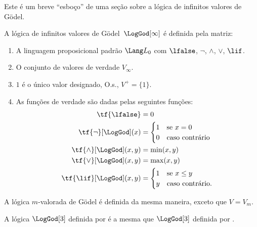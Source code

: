 \documentclass[../../../include/open-logic-section]{subfiles}
\begin{document}


\begin{editorial}
  Este é um breve ``esboço'' de uma seção sobre a lógica de infinitos
  valores de G\"odel.
\end{editorial}

\begin{defn} A lógica de infinitos valores de
G\"odel~$\LogGod[\infty]$ é definida pela matriz:
\begin{enumerate}
  \item A linguagem proposicional padrão $\Lang L_0$ com
  $\lfalse$, $\lnot$, $\land$, $\lor$, $\lif$.
  \item O conjunto de valores de verdade $V_\infty$.
  \item $1$ é o único valor designado, O.s.\@, $V^+ = \{1\}$.
  \item As funções de verdade são dadas pelas seguintes funções:
  \begin{align*}
    \tf{\lfalse} & = 0\\
    \tf{\lnot}[\LogGod](x) & = \begin{cases}
      $1$ & \text{se } x =0\\
      $0$ & \text{caso contrário}
    \end{cases}\\
    \tf{\land}[\LogGod](x,y) & = \min(x,y)\\
    \tf{\lor}[\LogGod](x,y) & = \max(x,y)\\
    \tf{\lif}[\LogGod](x,y) & = \begin{cases}
      1 & \text{se } x \le y\\
      y & \text{caso contrário.}
    \end{cases}
    \end{align*}
\end{enumerate}
A lógica $m$-valorada de G\"odel é definida da mesma maneira, exceto
que $V = V_m$.
\end{defn}

\begin{prop}
  A lógica $\LogGod[3]$ definida por 
  é a mesma que $\LogGod[3]$ definida por .
\end{prop}
\end{document}
